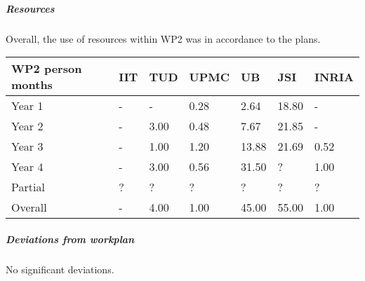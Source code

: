 \subparagraph*{Resources}
Overall, the use of resources within WP2 was in accordance to the plans. 

\begin{center}
\begin{tabular}{|C{1.5cm}|C{1.5cm}|C{1.5cm}|C{2cm}|C{2cm}|C{2cm}|C{2cm}|}
\hline
\footnotesize \textbf{WP2 person months}& \footnotesize \textbf{IIT}&\footnotesize \textbf{TUD}&\footnotesize \textbf{UPMC}& \footnotesize \textbf{UB} &\footnotesize \textbf{JSI} & \footnotesize \textbf{INRIA} \\ \hline
\footnotesize Year 1  &  -     & -    & 0.28 & 2.64  & 18.80  & -     \\  \hline
\footnotesize Year 2  &  -     & 3.00 & 0.48 & 7.67  & 21.85  & -     \\  \hline
\footnotesize Year 3  &  -     & 1.00 & 1.20 & 13.88 & 21.69  & 0.52  \\  \hline
\footnotesize Year 4  &  -     & 3.00 & 0.56 & 31.50 & ?      & 1.00  \\  \hline 
\footnotesize Partial & ?      & ?    & ?    & ?     & ?      & ?     \\
\hline \hline
\footnotesize Overall & -      & 4.00 & 1.00 & 45.00  & 55.00 & 1.00  \\  \hline
\end{tabular}
\end{center}

\subparagraph*{Deviations from workplan} 
No significant deviations.